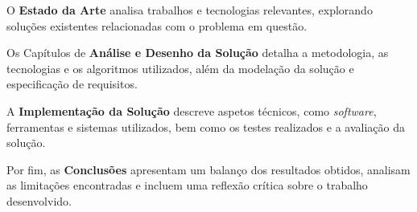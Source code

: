 O \textbf{Estado da Arte} analisa trabalhos e tecnologias relevantes, explorando soluções existentes relacionadas com o problema em questão.

Os Capítulos de \textbf{Análise e Desenho da Solução} detalha a metodologia, as tecnologias e os algoritmos utilizados, além da modelação da solução e especificação de requisitos.

A \textbf{Implementação da Solução} descreve aspetos técnicos, como \textit{software}, ferramentas e sistemas utilizados, bem como os testes realizados e a avaliação da solução.

Por fim, as \textbf{Conclusões} apresentam um balanço dos resultados obtidos, analisam as limitações encontradas e incluem uma reflexão crítica sobre o trabalho desenvolvido.

\vspace{20mm} 
